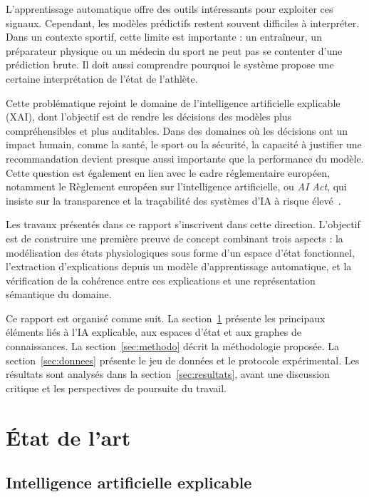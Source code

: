 \documentclass[12pt,a4paper]{article}
\begin{document}
L'apprentissage automatique offre des outils intéressants pour exploiter ces
signaux. Cependant, les modèles prédictifs restent souvent difficiles à
interpréter. Dans un contexte sportif, cette limite est importante : un
entraîneur, un préparateur physique ou un médecin du sport ne peut pas se
contenter d'une prédiction brute. Il doit aussi comprendre pourquoi le
système propose une certaine interprétation de l'état de l'athlète.

Cette problématique rejoint le domaine de l'intelligence artificielle
explicable (XAI), dont l'objectif est de rendre les décisions des modèles
plus compréhensibles et plus auditables. Dans des domaines où les décisions
ont un impact humain, comme la santé, le sport ou la sécurité, la capacité à
justifier une recommandation devient presque aussi importante que la
performance du modèle. Cette question est également en lien avec le cadre
réglementaire européen, notamment le Règlement européen sur l'intelligence
artificielle, ou \textit{AI Act}, qui insiste sur la transparence et la
traçabilité des systèmes d'IA à risque élevé~\cite{aiact}.

Les travaux présentés dans ce rapport s'inscrivent dans cette direction.
L'objectif est de construire une première preuve de concept combinant trois
aspects : la modélisation des états physiologiques sous forme d'un espace
d'état fonctionnel, l'extraction d'explications depuis un modèle
d'apprentissage automatique, et la vérification de la cohérence entre ces
explications et une représentation sémantique du domaine.

Ce rapport est organisé comme suit. La section~\ref{sec:etat_art} présente
les principaux éléments liés à l'IA explicable, aux espaces d'état et aux
graphes de connaissances. La section~\ref{sec:methodo} décrit la
méthodologie proposée. La section~\ref{sec:donnees} présente le jeu de
données et le protocole expérimental. Les résultats sont analysés dans la
section~\ref{sec:resultats}, avant une discussion critique et les
perspectives de poursuite du travail.

\section{État de l'art}
\label{sec:etat_art}

\subsection{Intelligence artificielle explicable}
\end{document}
